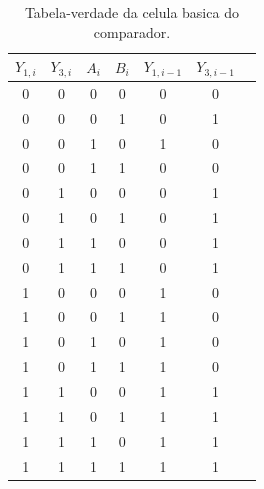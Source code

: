 \begin{table}[H]
    \centering
    \caption{Tabela-verdade da celula basica do comparador.}
    \begin{tabular}{ccccccc}
        \toprule
        $Y_{1,i}$ & $Y_{3,i}$ & $A_i$ & $B_i$ & $Y_{1,i-1}$ & $Y_{3,i-1}$ \\
        \midrule
        0         & 0         & 0     & 0     & 0           & 0           \\
        0         & 0         & 0     & 1     & 0           & 1           \\
        0         & 0         & 1     & 0     & 1           & 0           \\
        0         & 0         & 1     & 1     & 0           & 0           \\
        0         & 1         & 0     & 0     & 0           & 1           \\
        0         & 1         & 0     & 1     & 0           & 1           \\
        0         & 1         & 1     & 0     & 0           & 1           \\
        0         & 1         & 1     & 1     & 0           & 1           \\
        1         & 0         & 0     & 0     & 1           & 0           \\
        1         & 0         & 0     & 1     & 1           & 0           \\
        1         & 0         & 1     & 0     & 1           & 0           \\
        1         & 0         & 1     & 1     & 1           & 0           \\
        1         & 1         & 0     & 0     & 1           & 1           \\
        1         & 1         & 0     & 1     & 1           & 1           \\
        1         & 1         & 1     & 0     & 1           & 1           \\
        1         & 1         & 1     & 1     & 1           & 1           \\
        \bottomrule
    \end{tabular}
\end{table}